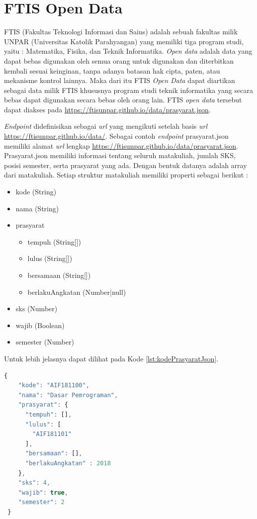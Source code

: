 \section{FTIS Open Data}
FTIS (Fakultas Teknologi Informasi dan Sains) adalah sebuah fakultas milik UNPAR (Universitas Katolik Parahyangan) yang memiliki tiga program studi, yaitu : Matematika, Fisika, dan Teknik Informatika. \textit{Open data} adalah data yang dapat bebas digunakan oleh semua orang untuk digunakan dan diterbitkan kembali sesuai keinginan, tanpa adanya batasan hak cipta, paten, atau mekanisme kontrol lainnya. Maka dari itu FTIS \textit{Open Data} dapat diartikan sebagai data milik FTIS khususnya program studi teknik informatika yang secara bebas dapat digunakan secara bebas oleh orang lain. FTIS \textit{open data} tersebut dapat diakses pada \url{https://ftisunpar.github.io/data/prasyarat.json}. \cite{ftisOpenData}

\textit{Endpoint} didefinisikan sebagai \textit{url} yang mengikuti setelah basis \textit{url} \url{https://ftisunpar.github.io/data/}. Sebagai contoh \textit{endpoint} prasyarat.json memiliki alamat \textit{url} lengkap \url{https://ftisunpar.github.io/data/prasyarat.json}. Prasyarat.json memiliki informasi tentang seluruh matakuliah, jumlah SKS, posisi semester, serta prasyarat yang ada. Dengan bentuk datanya adalah array dari matakuliah. Setiap struktur matakuliah memiliki properti sebagai berikut : 

\begin{itemize}
    \item kode (String)
    \item nama (String)
    \item prasyarat
    \begin{itemize}
        \item tempuh (String[])
        \item lulus (String[])
        \item bersamaan (String[])
        \item berlakuAngkatan (Number|null)
    \end{itemize}
    \item sks (Number)
    \item wajib (Boolean)
    \item semester (Number)
\end{itemize}

Untuk lebih jelasnya dapat dilihat pada Kode \ref{lst:kodePrasyaratJson}.
\newpage
\begin{lstlisting}[language=JavaScript, caption=prasyarat.json\label{lst:kodePrasyaratJson}]
{
    "kode": "AIF181100",
    "nama": "Dasar Pemrograman",
    "prasyarat": {
      "tempuh": [],
      "lulus": [
        "AIF181101"
      ],
      "bersamaan": [],
      "berlakuAngkatan" : 2018
    },
    "sks": 4,
    "wajib": true,
    "semester": 2
 }
\end{lstlisting}


